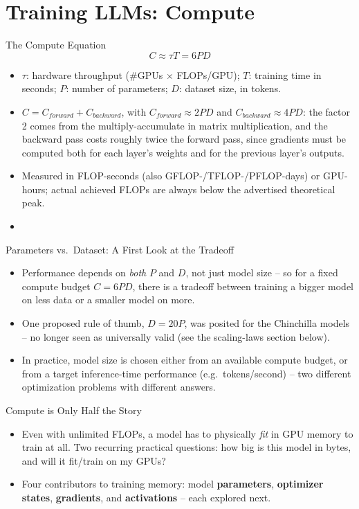 \section{Training LLMs: Compute}

\begin{vbframe}{The Compute Equation}
$$C \approx \tau T = 6PD$$
\begin{itemize}
  \item $\tau$: hardware throughput (\#GPUs $\times$ FLOPs/GPU); $T$: training time in seconds; $P$: number of parameters; $D$: dataset size, in tokens.
  \item $C = C_{forward} + C_{backward}$, with $C_{forward}\approx 2PD$ and $C_{backward}\approx 4PD$: the factor 2 comes from the multiply-accumulate in matrix multiplication, and the backward pass costs roughly twice the forward pass, since gradients must be computed both for each layer's weights and for the previous layer's outputs.
  \item Measured in FLOP-seconds (also GFLOP-/TFLOP-/PFLOP-days) or GPU-hours; actual achieved FLOPs are always below the advertised theoretical peak.
  \item {}
\end{itemize}
\end{vbframe}

\begin{vbframe}{Parameters vs.\ Dataset: A First Look at the Tradeoff}
\begin{itemize}
  \item Performance depends on \textit{both} $P$ and $D$, not just model size -- so for a fixed compute budget $C=6PD$, there is a tradeoff between training a bigger model on less data or a smaller model on more.
  \item One proposed rule of thumb, $D=20P$, was posited for the Chinchilla models  -- no longer seen as universally valid (see the scaling-laws section below).
  \item In practice, model size is chosen either from an available compute budget, or from a target inference-time performance (e.g.\ tokens/second) -- two different optimization problems with different answers.
\end{itemize}
\end{vbframe}

\begin{vbframe}{Compute is Only Half the Story}
\begin{itemize}
  \item Even with unlimited FLOPs, a model has to physically \textit{fit} in GPU memory to train at all. Two recurring practical questions: how big is this model in bytes, and will it fit/train on my GPUs?
  \item Four contributors to training memory: model \textbf{parameters}, \textbf{optimizer states}, \textbf{gradients}, and \textbf{activations} -- each explored next.
\end{itemize}
\end{vbframe}

